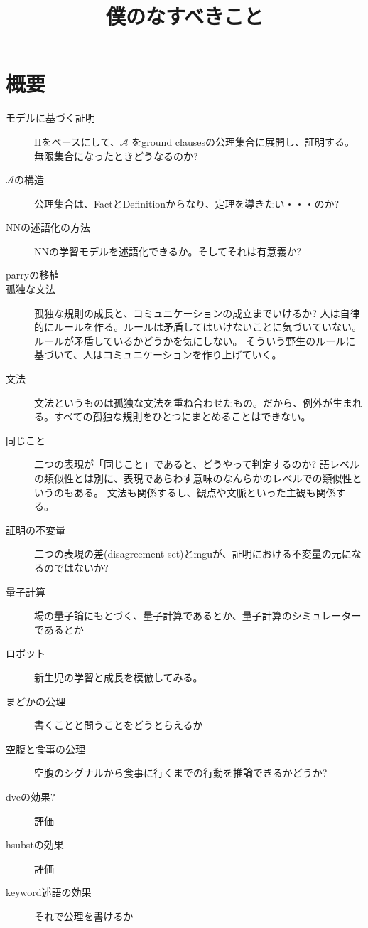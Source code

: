\documentclass[10pt, oneside]{jarticle}   	%
\title{僕のなすべきこと}
\author{\myname}
\begin{document}
\maketitle

\section{概要}
\begin{description}
\item[ モデルに基づく証明] Hをベースにして、$\mathcal{A}$ をground clausesの公理集合に展開し、証明する。
無限集合になったときどうなるのか?
\item[ $\mathcal{A}$の構造] 公理集合は、FactとDefinitionからなり、定理を導きたい・・・のか?
\item[ NNの述語化の方法] NNの学習モデルを述語化できるか。そしてそれは有意義か?
\item[ parryの移植] 
\item[ 孤独な文法] 孤独な規則の成長と、コミュニケーションの成立までいけるか?
人は自律的にルールを作る。ルールは矛盾してはいけないことに気づいていない。ルールが矛盾しているかどうかを気にしない。
そういう野生のルールに基づいて、人はコミュニケーションを作り上げていく。
\item[ 文法] 文法というものは孤独な文法を重ね合わせたもの。だから、例外が生まれる。すべての孤独な規則をひとつにまとめることはできない。

\item[同じこと] 二つの表現が「同じこと」であると、どうやって判定するのか?
語レベルの類似性とは別に、表現であらわす意味のなんらかのレベルでの類似性というのもある。
文法も関係するし、観点や文脈といった主観も関係する。

\item[ 証明の不変量] 二つの表現の差(disagreement set)とmguが、証明における不変量の元になるのではないか?

\item[量子計算] 場の量子論にもとづく、量子計算であるとか、量子計算のシミュレーターであるとか

\item[ロボット] 新生児の学習と成長を模倣してみる。

\item[ まどかの公理] 書くことと問うことをどうとらえるか 
\item[ 空腹と食事の公理] 空腹のシグナルから食事に行くまでの行動を推論できるかどうか?

\item[ dvcの効果?] 評価
\item[ hsubstの効果] 評価
\item[ keyword述語の効果] それで公理を書けるか
\end{description}
\end{document}
